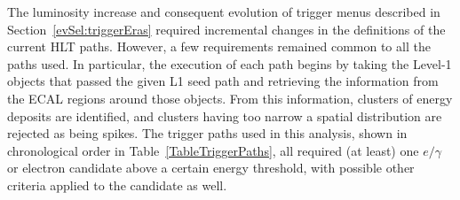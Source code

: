 





The luminosity increase and consequent evolution of trigger menus 
described in Section~\ref{evSel:triggerEras} required incremental changes 
in the definitions of the current HLT paths.  
However, a few requirements remained common to all the paths used.  
In particular, the execution of each path begins by taking 
the Level-1 objects that passed the given L1 seed path 
and retrieving the information from the ECAL regions %
around those objects.  
From this information, 
clusters of energy deposits are identified, 
and clusters having too narrow a spatial distribution are 
rejected as being spikes.  
The trigger paths used in this analysis, 
shown in chronological order in Table~\ref{TableTriggerPaths}, 
all required (at least) one 
$e/\gamma$ or electron candidate above a certain energy threshold, 
with possible other criteria applied to the candidate as well.%

